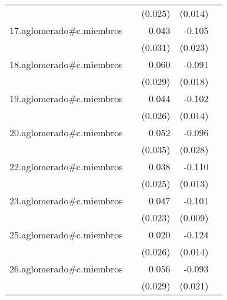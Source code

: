 {\begin{longtable}{l*{4}{D{.}{.}{-1}}}
            &                     &     (0.025)         &     (0.014)         &                     \\
\addlinespace
17.aglomerado#c.miembros&                     &       0.043         &      -0.105\sym{***}&                     \\
            &                     &     (0.031)         &     (0.023)         &                     \\
\addlinespace
18.aglomerado#c.miembros&                     &       0.060\sym{*}  &      -0.091\sym{***}&                     \\
            &                     &     (0.029)         &     (0.018)         &                     \\
\addlinespace
19.aglomerado#c.miembros&                     &       0.044         &      -0.102\sym{***}&                     \\
            &                     &     (0.026)         &     (0.014)         &                     \\
\addlinespace
20.aglomerado#c.miembros&                     &       0.052         &      -0.096\sym{***}&                     \\
            &                     &     (0.035)         &     (0.028)         &                     \\
\addlinespace
22.aglomerado#c.miembros&                     &       0.038         &      -0.110\sym{***}&                     \\
            &                     &     (0.025)         &     (0.013)         &                     \\
\addlinespace
23.aglomerado#c.miembros&                     &       0.047\sym{*}  &      -0.101\sym{***}&                     \\
            &                     &     (0.023)         &     (0.009)         &                     \\
\addlinespace
25.aglomerado#c.miembros&                     &       0.020         &      -0.124\sym{***}&                     \\
            &                     &     (0.026)         &     (0.014)         &                     \\
\addlinespace
26.aglomerado#c.miembros&                     &       0.056         &      -0.093\sym{***}&                     \\
            &                     &     (0.029)         &     (0.021)         &                     \\

\end{longtable}}
